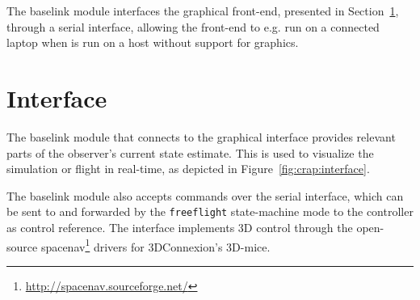             The baselink module interfaces the graphical front-end, presented in Section~\ref{sec:crap:interface},
            through a serial interface, allowing the front-end to e.g. run on
            a connected laptop when \crap is run on a host without support for graphics.

    \section{Interface}
    \label{sec:crap:interface}
        The baselink module that connects to the graphical interface
        provides relevant parts of the observer's current state estimate.
        This is used to visualize the simulation or flight in real-time, as
        depicted in Figure~\ref{fig:crap:interface}.

        The baselink module also accepts commands over the serial interface,
        which can be sent to \crap and forwarded by the \texttt{freeflight}
        state-machine mode to the controller as control reference.
        The interface implements 3D control through the open-source
        spacenav\footnote{\url{http://spacenav.sourceforge.net/}} drivers
        for 3DConnexion's 3D-mice.

